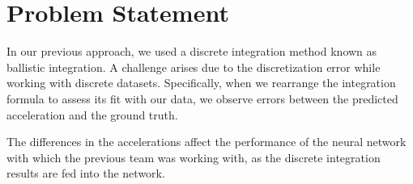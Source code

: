 \section{Problem Statement}

In our previous approach, we used a discrete integration method known as ballistic integration. 
A challenge arises due to the discretization error while working with discrete datasets.
Specifically, when we rearrange the integration formula to assess its fit with our data, we observe errors between the predicted acceleration and the ground truth.

The differences in the accelerations affect the performance of the neural network with which the previous team was working with, 
as the discrete integration results are fed into the network.

